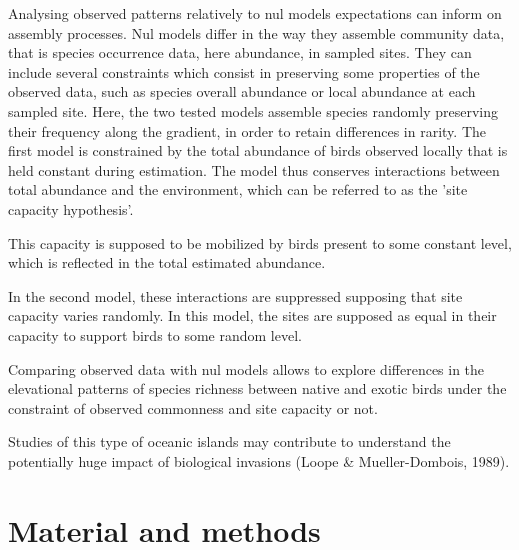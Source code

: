 \documentclass{article}\usepackage[]{graphicx}\usepackage[]{color}
\begin{document}
Analysing observed patterns relatively to nul models expectations can inform on assembly processes. Nul models differ in the way they assemble community data, that is species occurrence data, here abundance, in sampled sites. They can include several constraints which consist in preserving some properties of the observed data, such as species overall abundance or local abundance at each sampled site. Here, the two tested models assemble species randomly preserving their frequency along the gradient, in order to retain differences in rarity. The first model is constrained by the total abundance of birds observed locally that is held constant during estimation. The model thus conserves interactions between total abundance and the environment, which can be referred to as the 'site capacity hypothesis'. 


This capacity is supposed to be mobilized by birds present to some constant level, which is reflected in the total estimated abundance. 

In the second model, these interactions are suppressed supposing that site capacity varies randomly. In this model, the sites are supposed as equal in their capacity to support birds to some random level. 

Comparing observed data with nul models allows to explore differences in the elevational patterns of species richness between native and exotic birds under the constraint of observed commonness and site capacity or not. 



Studies of this type of oceanic islands may contribute to understand the potentially huge impact of biological invasions (Loope \& Mueller-Dombois, 1989). 




\section*{Material and methods}
\end{document}
